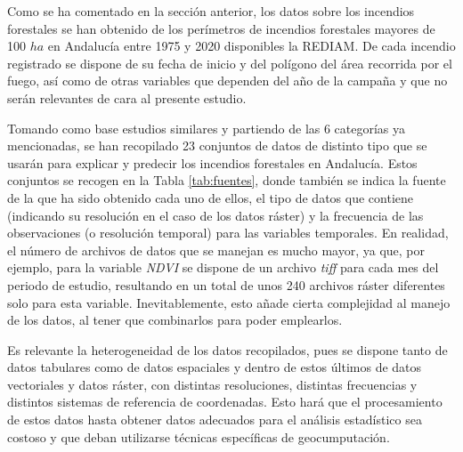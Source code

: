\documentclass[12pt,a4paper,]{book}
\numberwithin{dummy}{section}
\theoremstyle{ocrenumbox}
\theoremstyle{blacknumex}
\theoremstyle{blacknumbox}
\theoremstyle{ocrenum}
\theoremstyle{ocrenum}
\begin{document}
Como se ha comentado en la sección anterior, los datos sobre los
incendios forestales se han obtenido de los perímetros de incendios
forestales mayores de 100 \(ha\) en Andalucía entre 1975 y 2020
disponibles la REDIAM. De cada incendio registrado se dispone de su
fecha de inicio y del polígono del área recorrida por el fuego, así como
de otras variables que dependen del año de la campaña y que no serán
relevantes de cara al presente estudio.

Tomando como base estudios similares
\citep{incendiosAndalucia, SAYAD2019130, stojanova2012estimating} y
partiendo de las 6 categorías ya mencionadas, se han recopilado 23
conjuntos de datos de distinto tipo que se usarán para explicar y
predecir los incendios forestales en Andalucía. Estos conjuntos se
recogen en la Tabla \ref{tab:fuentes}, donde también se indica la fuente
de la que ha sido obtenido cada uno de ellos, el tipo de datos que
contiene (indicando su resolución en el caso de los datos ráster) y la
frecuencia de las observaciones (o resolución temporal) para las
variables temporales. En realidad, el número de archivos de datos que se
manejan es mucho mayor, ya que, por ejemplo, para la variable
\emph{NDVI} se dispone de un archivo \emph{tiff} para cada mes del
periodo de estudio, resultando en un total de unos 240 archivos ráster
diferentes solo para esta variable. Inevitablemente, esto añade cierta
complejidad al manejo de los datos, al tener que combinarlos para poder
emplearlos.

Es relevante la heterogeneidad de los datos recopilados, pues se dispone
tanto de datos tabulares como de datos espaciales y dentro de estos
últimos de datos vectoriales y datos ráster, con distintas resoluciones,
distintas frecuencias y distintos sistemas de referencia de coordenadas.
Esto hará que el procesamiento de estos datos hasta obtener datos
adecuados para el análisis estadístico sea costoso y que deban
utilizarse técnicas específicas de geocumputación.
\end{document}
